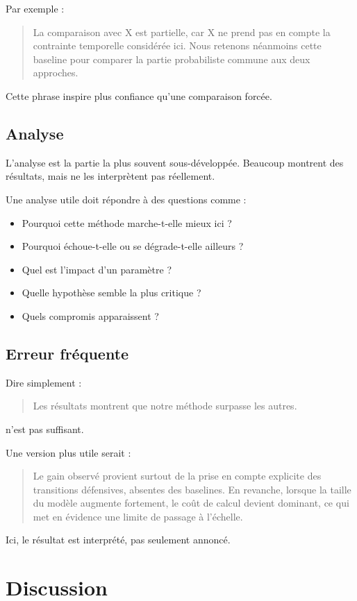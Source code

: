\documentclass[11pt,a4paper]{article}
\theoremstyle{definition}
\begin{document}
Par exemple :
\begin{quote}
La comparaison avec X est partielle, car X ne prend pas en compte la contrainte temporelle considérée ici. Nous retenons néanmoins cette baseline pour comparer la partie probabiliste commune aux deux approches.
\end{quote}

Cette phrase inspire plus confiance qu'une comparaison forcée.

\subsection*{Analyse}

L'analyse est la partie la plus souvent sous-développée. Beaucoup montrent des résultats, mais ne les interprètent pas réellement.

Une analyse utile doit répondre à des questions comme :
\begin{itemize}
    \item Pourquoi cette méthode marche-t-elle mieux ici ?
    \item Pourquoi échoue-t-elle ou se dégrade-t-elle ailleurs ?
    \item Quel est l'impact d'un paramètre ?
    \item Quelle hypothèse semble la plus critique ?
    \item Quels compromis apparaissent ?
\end{itemize}

\subsection*{Erreur fréquente}

Dire simplement :
\begin{quote}
Les résultats montrent que notre méthode surpasse les autres.
\end{quote}
n'est pas suffisant.

Une version plus utile serait :
\begin{quote}
Le gain observé provient surtout de la prise en compte explicite des transitions défensives, absentes des baselines. En revanche, lorsque la taille du modèle augmente fortement, le coût de calcul devient dominant, ce qui met en évidence une limite de passage à l'échelle.
\end{quote}

Ici, le résultat est interprété, pas seulement annoncé.

\section{Discussion}
\end{document}
